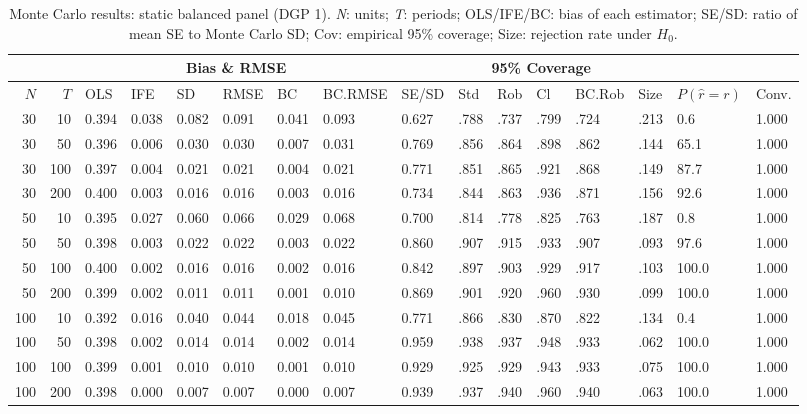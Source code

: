 \begin{table}[ht]
\centering
\caption{Monte Carlo results: static balanced panel (DGP 1). \emph{N}: units; \emph{T}: periods; OLS/IFE/BC: bias of each estimator; SE/SD: ratio of mean SE to Monte Carlo SD; Cov: empirical 95\% coverage; Size: rejection rate under $H_0$.} 
\label{tab:mc_static_bal}
\begin{tabular}{rrllllllllllllll}
  \hline
 & & \multicolumn{6}{c}{Bias \& RMSE} & & \multicolumn{4}{c}{95\% Coverage} & & & \\
\cline{3-8}\cline{10-13}
 \hline
$N$ & $T$ & OLS & IFE & SD & RMSE & BC & BC.RMSE & SE/SD & Std & Rob & Cl & BC.Rob & Size & $P(\hat r=r)$ & Conv. \\ 
  \hline
30 & 10 & 0.394 & 0.038 & 0.082 & 0.091 & 0.041 & 0.093 & 0.627 & .788 & .737 & .799 & .724 & .213 & 0.6 & 1.000 \\ 
  30 & 50 & 0.396 & 0.006 & 0.030 & 0.030 & 0.007 & 0.031 & 0.769 & .856 & .864 & .898 & .862 & .144 & 65.1 & 1.000 \\ 
  30 & 100 & 0.397 & 0.004 & 0.021 & 0.021 & 0.004 & 0.021 & 0.771 & .851 & .865 & .921 & .868 & .149 & 87.7 & 1.000 \\ 
  30 & 200 & 0.400 & 0.003 & 0.016 & 0.016 & 0.003 & 0.016 & 0.734 & .844 & .863 & .936 & .871 & .156 & 92.6 & 1.000 \\ 
  50 & 10 & 0.395 & 0.027 & 0.060 & 0.066 & 0.029 & 0.068 & 0.700 & .814 & .778 & .825 & .763 & .187 & 0.8 & 1.000 \\ 
  50 & 50 & 0.398 & 0.003 & 0.022 & 0.022 & 0.003 & 0.022 & 0.860 & .907 & .915 & .933 & .907 & .093 & 97.6 & 1.000 \\ 
  50 & 100 & 0.400 & 0.002 & 0.016 & 0.016 & 0.002 & 0.016 & 0.842 & .897 & .903 & .929 & .917 & .103 & 100.0 & 1.000 \\ 
  50 & 200 & 0.399 & 0.002 & 0.011 & 0.011 & 0.001 & 0.010 & 0.869 & .901 & .920 & .960 & .930 & .099 & 100.0 & 1.000 \\ 
  100 & 10 & 0.392 & 0.016 & 0.040 & 0.044 & 0.018 & 0.045 & 0.771 & .866 & .830 & .870 & .822 & .134 & 0.4 & 1.000 \\ 
  100 & 50 & 0.398 & 0.002 & 0.014 & 0.014 & 0.002 & 0.014 & 0.959 & .938 & .937 & .948 & .933 & .062 & 100.0 & 1.000 \\ 
  100 & 100 & 0.399 & 0.001 & 0.010 & 0.010 & 0.001 & 0.010 & 0.929 & .925 & .929 & .943 & .933 & .075 & 100.0 & 1.000 \\ 
  100 & 200 & 0.398 & 0.000 & 0.007 & 0.007 & 0.000 & 0.007 & 0.939 & .937 & .940 & .960 & .940 & .063 & 100.0 & 1.000 \\ 

\end{tabular}
\end{table}

